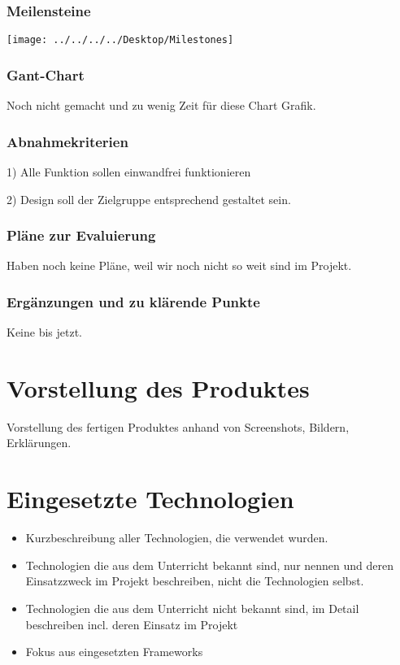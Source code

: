 \subsection{Meilensteine}

\begin{center}
	\texttt{[image: ../../../../Desktop/Milestones]}
\end{center}


\subsection{Gant-Chart}

Noch nicht gemacht und zu wenig Zeit für diese Chart Grafik.

\subsection{Abnahmekriterien}

1) Alle Funktion sollen einwandfrei funktionieren

2) Design soll der Zielgruppe entsprechend gestaltet sein.


\subsection{Pläne zur Evaluierung}

Haben noch keine Pläne, weil wir noch nicht so weit sind im Projekt.

\subsection{Ergänzungen und zu klärende Punkte}

Keine bis jetzt.

\chapter{Vorstellung des Produktes}
Vorstellung des fertigen Produktes anhand von Screenshots, Bildern, Erklärungen.

\chapter{Eingesetzte Technologien}
\begin{itemize}
	\item Kurzbeschreibung aller Technologien, die verwendet wurden.
	\item Technologien die aus dem Unterricht bekannt sind, nur nennen und deren  Einsatzzweck im Projekt beschreiben, nicht die Technologien selbst.
	\item Technologien die aus dem Unterricht nicht bekannt sind, im Detail beschreiben incl. deren Einsatz im Projekt
	\item Fokus aus eingesetzten Frameworks
\end{itemize}

